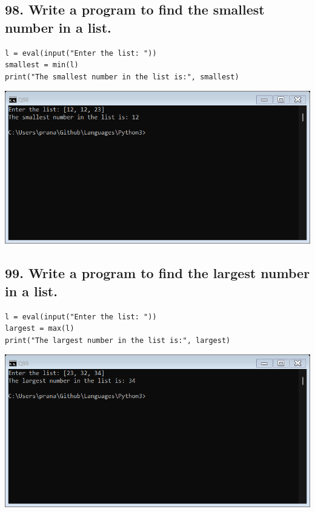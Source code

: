\documentclass[12pt]{article}
\begin{document}
\subsection*{98. Write a program to find the smallest number in a list.}
\begin{verbatim}
l = eval(input("Enter the list: "))
smallest = min(l)
print("The smallest number in the list is:", smallest)
\end{verbatim}
\includegraphics[width=\linewidth]{images/98.png}

\subsection*{99. Write a program to find the largest number in a list.}
\begin{verbatim}
l = eval(input("Enter the list: "))
largest = max(l)
print("The largest number in the list is:", largest)
\end{verbatim}
\includegraphics[width=\linewidth]{images/99.png}
\end{document}
